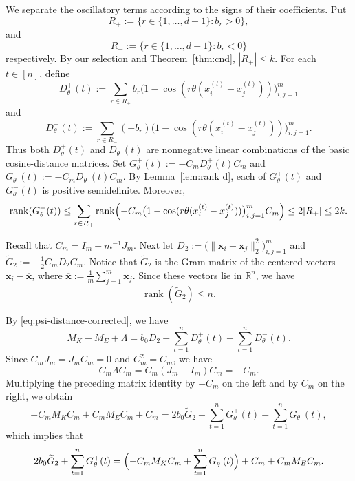 \documentclass[11pt]{article}
\theoremstyle{definition}
\begin{document}
We separate the oscillatory terms according to the signs of their coefficients. Put
\[
R_+:=\{r\in\{1,\dots,d-1\}:b_r>0\},\]
and \[
R_-:=\{r\in\{1,\dots,d-1\}:b_r<0\}
\]
respectively. By our selection and Theorem~\ref{thm:cnd}, \(|R_+|\le k\). For each \(t\in[n]\), define
\[
D_\theta^+(t):=
\sum_{r\in R_+} b_r
\bigl(1-\cos(r\theta(x_i^{(t)}-x_j^{(t)}))\bigr)_{i,j=1}^m
\]
and
\[
D_\theta^-(t):=
\sum_{r\in R_-} (-b_r)
\bigl(1-\cos(r\theta(x_i^{(t)}-x_j^{(t)}))\bigr)_{i,j=1}^m.
\]
Thus both \(D_\theta^+(t)\) and \(D_\theta^-(t)\) are nonnegative linear combinations of the basic cosine-distance matrices. Set
\(
G_\theta^+(t):=-C_mD_\theta^+(t)C_m\) and
\(
G_\theta^-(t):=-C_mD_\theta^-(t)C_m.
\)
By Lemma~\ref{lem:rank d}, each of \(G_\theta^+(t)\) and \(G_\theta^-(t)\) is positive semidefinite. Moreover,
\[
\operatorname{rank}(G_\theta^+(t))
\le
\sum_{r\in R_+}
\operatorname{rank}\Bigl(
-C_m\bigl(1-\cos(r\theta(x_i^{(t)}-x_j^{(t)}))\bigr)_{i,j=1}^mC_m
\Bigr)
\le 2|R_+|\le 2k.
\]

Recall that \(
C_m=I_m-m^{-1}J_m.\) Next let
\(
D_2:=\bigl(\|\boldsymbol{x}_i-\boldsymbol{x}_j\|_2^2\bigr)_{i,j=1}^m
\) and \(
\widetilde G_2:=-\frac12 C_mD_2C_m.
\)
Notice that
\(\widetilde G_2\) is the Gram matrix of the centered vectors
\(
\boldsymbol{x}_i-\overline{\boldsymbol{x}}\), where
\(
\overline{\boldsymbol{x}}:=\frac1m\sum_{j=1}^m\boldsymbol{x}_j.
\)
Since these vectors lie in \(\mathbb R^n\), we have
\[
\operatorname{rank}(\widetilde G_2)\le n.
\]



By \eqref{eq:psi-distance-corrected}, we have
\[
M_K-M_E+\Lambda
=
b_0D_2+\sum_{t=1}^nD_\theta^+(t)-\sum_{t=1}^nD_\theta^-(t).
\]
Since \(C_mJ_m=J_mC_m=0\) and \(C_m^2=C_m\), we have
\[
C_m\Lambda C_m=C_m(J_m-I_m)C_m=-C_m.
\]
Multiplying the preceding matrix identity by \(-C_m\) on the left and by \(C_m\) on the right, we obtain
\[
-C_mM_KC_m+C_mM_EC_m+C_m
=
2b_0\widetilde G_2+\sum_{t=1}^nG_\theta^+(t)-\sum_{t=1}^nG_\theta^-(t),
\]
which implies that
\begin{equation}\label{eq:main-rank-identity-corrected}
2b_0\widetilde G_2+\sum_{t=1}^nG_\theta^+(t)
=
\Bigl(-C_mM_KC_m+\sum_{t=1}^nG_\theta^-(t)\Bigr)+C_m+C_mM_EC_m.
\end{equation}
\end{document}
